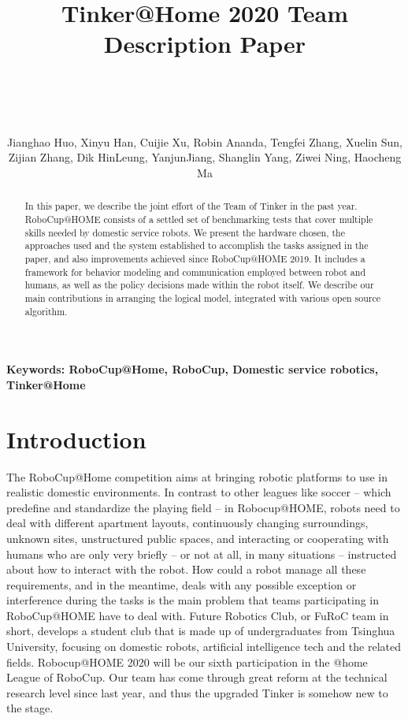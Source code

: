 \documentclass[runningheads,UTF8,fntef,a4paper]{llncs}
\begin{document}
	
\title{Tinker@Home 2020 Team Description Paper
\author{Jianghao Huo, Xinyu Han, Cuijie Xu, Robin Ananda, Tengfei Zhang, Xuelin Sun, Zijian Zhang, Dik HinLeung, YanjunJiang, Shanglin Yang, Ziwei Ning, Haocheng Ma}\quad\\
}
\maketitle

\begin{abstract}
In this paper, we describe the joint effort of the Team of Tinker in the past year. RoboCup@HOME consists of a settled set of benchmarking tests that cover multiple skills needed by domestic service robots. We present the hardware chosen, the approaches used and the system established to accomplish the tasks assigned in the paper, and also improvements achieved since RoboCup@HOME 2019. It includes a framework for behavior modeling and communication employed between robot and humans, as well as the policy decisions made within the robot itself. We describe our main contributions in arranging the logical model, integrated with various open source algorithm.
\end{abstract}
\begin{small}
\textbf{Keywords: RoboCup@Home, RoboCup,  Domestic service robotics, Tinker@Home}	
\end{small}
\section{Introduction}
The RoboCup@Home competition \cite{TP-toolbox-web} aims at bringing robotic platforms to use in realistic domestic environments. In contrast to other leagues like soccer – which predefine and standardize the playing field – in Robocup@HOME, robots need to deal with different apartment layouts, continuously changing surroundings, unknown sites, unstructured public spaces, and interacting or cooperating with humans who are only very briefly – or not at all, in many situations – instructed about how to interact with the robot. How could a robot manage all these requirements, and in the meantime, deals with any possible exception or interference during the tasks is the main problem that teams participating in RoboCup@HOME have to deal with.
Future Robotics Club, or FuRoC team in short, develops a student club that is made up of undergraduates from Tsinghua University, focusing on domestic robots, artificial intelligence tech and the related fields. Robocup@HOME 2020 will be our sixth participation in the @home League of RoboCup. Our team has come through great reform at the technical research level since last year, and thus the upgraded Tinker is somehow new to the stage.
\end{document}
